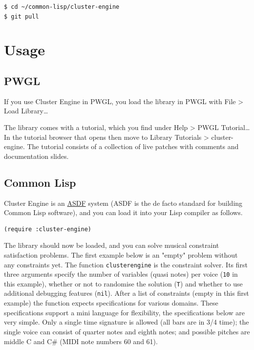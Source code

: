 \lstset{language=bash,label= ,caption= ,captionpos=b,numbers=none}
\begin{lstlisting}
$ cd ~/common-lisp/cluster-engine
$ git pull
\end{lstlisting}




\section*{Usage}
\label{sec:org44cdfb1}

\subsection*{PWGL}
\label{sec:org4b052d1}

If you use Cluster Engine in PWGL, you load the library in PWGL with File > Load Library\ldots{}

The library comes with a tutorial, which you find under Help > PWGL Tutorial\ldots{} In the tutorial browser that opens then move to Library Tutorials > cluster-engine. The tutorial consists of a collection of live patches with comments and documentation slides. 


\subsection*{Common Lisp}
\label{sec:org320ce29}

Cluster Engine is an \href{https://common-lisp.net/project/asdf/}{ASDF} system (ASDF is the de facto standard for building Common Lisp software), and you can load it into your Lisp compiler as follows.

\lstset{language=Lisp,label= ,caption= ,captionpos=b,numbers=none}
\begin{lstlisting}
(require :cluster-engine)
\end{lstlisting}

The library should now be loaded, and you can solve musical constraint satisfaction problems. The first example below is an "empty" problem without any constraints yet. The function \texttt{clusterengine} is the constraint solver. Its first three arguments specify the number of variables (quasi notes) per voice (\texttt{10} in this example), whether or not to randomise the solution (\texttt{T}) and whether to use additional debugging features (\texttt{nil}).  After a list of constraints (empty in this first example) the function expects specifications for various domains. These specifications support a mini language for flexibility, the specifications below are very simple. Only a single time signature is allowed (all bars are in 3/4 time); the single voice can consist of quarter notes and eighth notes; and possible pitches are middle C and C\# (MIDI note numbers 60 and 61).  

